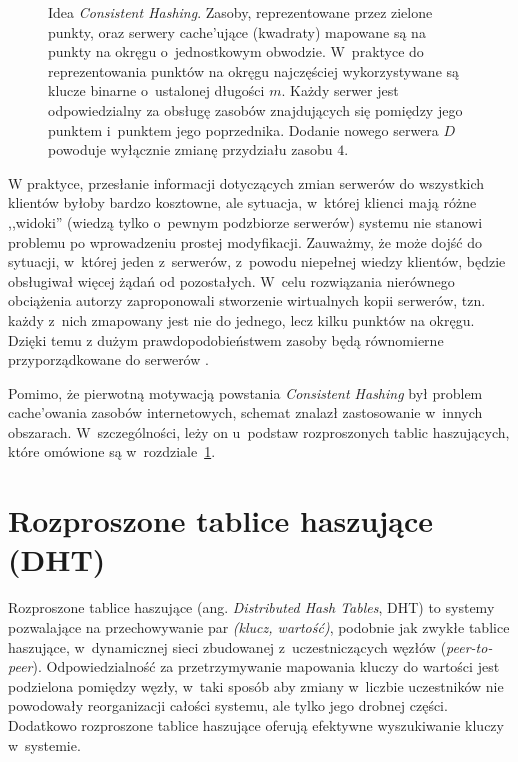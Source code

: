 \documentclass[a4paper,11pt]{scrartcl}
\newcommand{\s}{ }
\newcommand{\keszujace}{cache'ujące}
\newcommand{\keszowania}{cache'owania}
\begin{document}
\begin{figure}[ht]
\begin{minipage}[b]{0.47\linewidth}
\end{minipage}
\caption{Idea \textit{Consistent Hashing}. Zasoby, reprezentowane przez zielone punkty, oraz serwery \keszujace\s (kwadraty) mapowane są na punkty na okręgu o~jednostkowym obwodzie. W~praktyce do reprezentowania punktów na okręgu najczęściej wykorzystywane są klucze binarne o~ustalonej długości $m$. Każdy serwer jest odpowiedzialny za obsługę zasobów znajdujących się pomiędzy jego punktem i~punktem jego poprzednika. Dodanie nowego serwera $D$ powoduje wyłącznie zmianę przydziału zasobu $4$.}
\label{fig_consistent_hashing}
\end{figure}

W praktyce, przesłanie informacji dotyczących zmian serwerów do wszystkich klientów byłoby bardzo kosztowne, ale sytuacja, w~której klienci mają różne ,,widoki'' (wiedzą tylko o~pewnym podzbiorze serwerów) systemu nie stanowi problemu po wprowadzeniu prostej modyfikacji. Zauważmy, że może dojść do sytuacji, w~której jeden z~serwerów, z~powodu niepełnej wiedzy klientów, będzie obsługiwał więcej żądań od pozostałych. W~celu rozwiązania nierównego obciążenia autorzy zaproponowali stworzenie wirtualnych kopii serwerów, tzn. każdy z~nich zmapowany jest nie do jednego, lecz kilku punktów na okręgu. Dzięki temu z dużym prawdopodobieństwem zasoby będą równomierne przyporządkowane do serwerów \cite{karger1999web}.

Pomimo, że pierwotną motywacją powstania \textit{Consistent Hashing} był problem \keszowania\s zasobów internetowych, schemat znalazł zastosowanie w~innych obszarach. W~szczególności, leży on u~podstaw rozproszonych tablic haszujących, które omówione są w~rozdziale~\ref{sect_dht}.

\section{Rozproszone tablice haszujące (DHT)}
\label{sect_dht}
Rozproszone tablice haszujące (ang. \textit{Distributed Hash Tables}, DHT) to systemy pozwalające na przechowywanie par \textit{(klucz, wartość)}, podobnie jak zwykłe tablice haszujące, w~dynamicznej sieci zbudowanej z~uczestniczących węzłów (\textit{peer-to-peer}). Odpowiedzialność za przetrzymywanie mapowania kluczy do wartości jest podzielona pomiędzy węzły, w~taki sposób aby zmiany w~liczbie uczestników nie powodowały reorganizacji całości systemu, ale tylko jego drobnej części. Dodatkowo rozproszone tablice haszujące oferują efektywne wyszukiwanie kluczy w~systemie.
\end{document}
